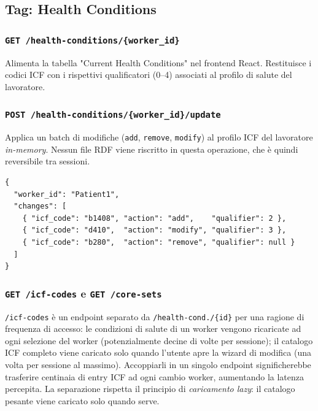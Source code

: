 \documentclass[a4paper,12pt]{article}
\begin{document}
\subsection{Tag: Health Conditions}

\subsubsection{\texttt{GET /health-conditions/\{worker\_\allowbreak{}id\}}}

Alimenta la tabella "Current Health Conditions" nel frontend React.
Restituisce i codici ICF con i rispettivi qualificatori (0--4) associati
al profilo di salute del lavoratore.

\subsubsection{\texttt{POST /health-conditions/\{worker\_\allowbreak{}id\}/update}}

Applica un batch di modifiche (\texttt{add}, \texttt{remove},
\texttt{modify}) al profilo ICF del lavoratore \textit{in-memory}.
Nessun file RDF viene riscritto in questa operazione, che \`{e} quindi
reversibile tra sessioni.

\begin{lstlisting}[caption={Request body per l'update delle condizioni ICF.}]
{
  "worker_id": "Patient1",
  "changes": [
    { "icf_code": "b1408", "action": "add",    "qualifier": 2 },
    { "icf_code": "d410",  "action": "modify", "qualifier": 3 },
    { "icf_code": "b280",  "action": "remove", "qualifier": null }
  ]
}
\end{lstlisting}

\noindent \subsubsection{\texttt{GET /icf-codes} e \texttt{GET /core-sets}}

\texttt{/icf-codes} \`{e} un endpoint separato da
\texttt{/health-cond./\allowbreak\{id\}} per una ragione di frequenza di accesso:
le condizioni di salute di un worker vengono ricaricate ad ogni selezione
del worker (potenzialmente decine di volte per sessione); il catalogo ICF
completo viene caricato solo quando l'utente apre la wizard di modifica
(una volta per sessione al massimo). Accoppiarli in un singolo endpoint
significherebbe trasferire centinaia di entry ICF ad ogni cambio worker,
aumentando la latenza percepita. La separazione rispetta il principio di
\textit{caricamento lazy}: il catalogo pesante viene caricato solo quando
serve.
\end{document}
